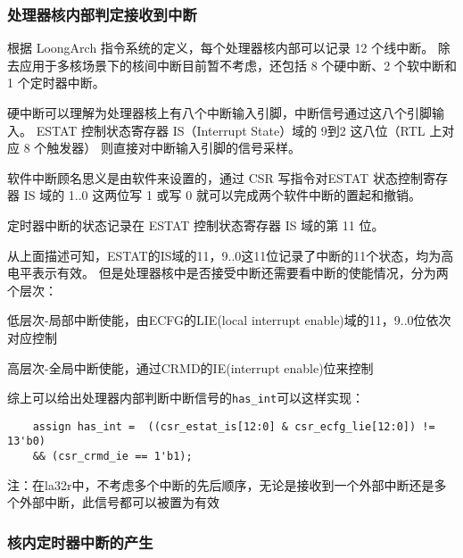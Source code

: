\subsubsection{处理器核内部判定接收到中断}

根据 LoongArch 指令系统的定义，每个处理器核内部可以记录 12 个线中断。
除去应用于多核场景下的核间中断目前暂不考虑，还包括 8 个硬中断、2 个软中断和 1 个定时器中断。

硬中断可以理解为处理器核上有八个中断输入引脚，中断信号通过这八个引脚输入。
ESTAT 控制状态寄存器 IS（Interrupt State）域的 9到2 这八位（RTL 上对应 8 个触发器）
则直接对中断输入引脚的信号采样。

软件中断顾名思义是由软件来设置的，通过 CSR 写指令对ESTAT 状态控制寄存器 IS 域的 1..0 
这两位写 1 或写 0 就可以完成两个软件中断的置起和撤销。

定时器中断的状态记录在 ESTAT 控制状态寄存器 IS 域的第 11 位。

从上面描述可知，ESTAT的IS域的11，9..0这11位记录了中断的11个状态，均为高电平表示有效。
但是处理器核中是否接受中断还需要看中断的使能情况，分为两个层次：

低层次-局部中断使能，由ECFG的LIE(local interrupt enable)域的11，9..0位依次对应控制

高层次-全局中断使能，通过CRMD的IE(interrupt enable)位来控制

综上可以给出处理器内部判断中断信号的\texttt{has\_int}可以这样实现：

\begin{lstlisting}
    assign has_int =  ((csr_estat_is[12:0] & csr_ecfg_lie[12:0]) != 13'b0)
    && (csr_crmd_ie == 1'b1);
\end{lstlisting}

注：在la32r中，不考虑多个中断的先后顺序，无论是接收到一个外部中断还是多个外部中断，此信号都可以被置为有效

\subsubsection{核内定时器中断的产生}

